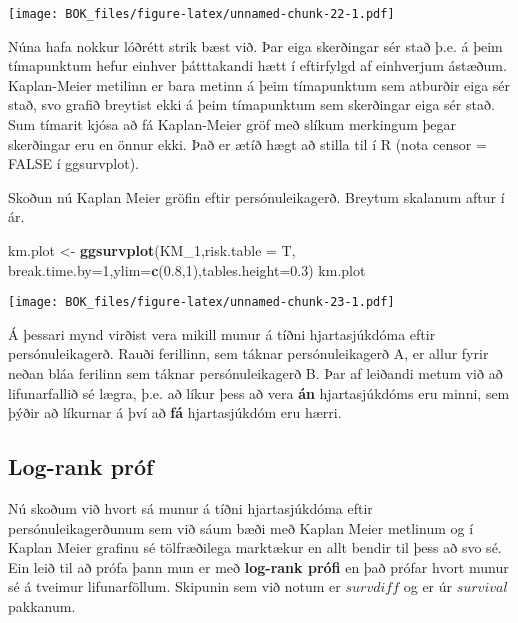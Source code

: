 \documentclass[
]{book}
\newenvironment{Shaded}{\begin{snugshade}}{\end{snugshade}}
\newcommand{\DataTypeTok}[1]{\textcolor[rgb]{0.13,0.29,0.53}{#1}}
\newcommand{\DecValTok}[1]{\textcolor[rgb]{0.00,0.00,0.81}{#1}}
\newcommand{\FloatTok}[1]{\textcolor[rgb]{0.00,0.00,0.81}{#1}}
\newcommand{\KeywordTok}[1]{\textcolor[rgb]{0.13,0.29,0.53}{\textbf{#1}}}
\newcommand{\NormalTok}[1]{#1}
\newcommand{\StringTok}[1]{\textcolor[rgb]{0.31,0.60,0.02}{#1}}
\begin{document}
\texttt{[image: BOK\_files/figure-latex/unnamed-chunk-22-1.pdf]}

Núna hafa nokkur lóðrétt strik bæst við. Þar eiga skerðingar sér stað þ.e. á þeim tímapunktum hefur einhver þátttakandi hætt í eftirfylgd af einhverjum ástæðum. Kaplan-Meier metilinn er bara metinn á þeim tímapunktum sem atburðir eiga sér stað, svo grafið breytist ekki á þeim tímapunktum sem skerðingar eiga sér stað. Sum tímarit kjósa að fá Kaplan-Meier gröf með slíkum merkingum þegar skerðingar eru en önnur ekki. Það er ætíð hægt að stilla til í R (nota censor = FALSE í ggsurvplot).

Skoðun nú Kaplan Meier gröfin eftir persónuleikagerð. Breytum skalanum aftur í ár.

\begin{Shaded}
\begin{Highlighting}[]
\NormalTok{km.plot <{-}}\StringTok{ }\KeywordTok{ggsurvplot}\NormalTok{(KM\_}\DecValTok{1}\NormalTok{,}\DataTypeTok{risk.table =}\NormalTok{ T,}
                        \DataTypeTok{break.time.by=}\DecValTok{1}\NormalTok{,}\DataTypeTok{ylim=}\KeywordTok{c}\NormalTok{(}\FloatTok{0.8}\NormalTok{,}\DecValTok{1}\NormalTok{),}\DataTypeTok{tables.height=}\FloatTok{0.3}\NormalTok{) }
\NormalTok{km.plot}
\end{Highlighting}
\end{Shaded}

\texttt{[image: BOK\_files/figure-latex/unnamed-chunk-23-1.pdf]}

Á þessari mynd virðist vera mikill munur á tíðni hjartasjúkdóma eftir persónuleikagerð. Rauði ferillinn, sem táknar persónuleikagerð A, er allur fyrir neðan bláa ferilinn sem táknar persónuleikagerð B. Þar af leiðandi metum við að lifunarfallið sé lægra, þ.e. að líkur þess að vera \textbf{án} hjartasjúkdóms eru minni, sem þýðir að líkurnar á því að \textbf{fá} hjartasjúkdóm eru hærri.

\hypertarget{log-rank-pruxf3f}{%
\subsection{Log-rank próf}\label{log-rank-pruxf3f}}

Nú skoðum við hvort sá munur á tíðni hjartasjúkdóma eftir persónuleikagerðunum sem við sáum bæði með Kaplan Meier metlinum og í Kaplan Meier grafinu sé tölfræðilega marktækur en allt bendir til þess að svo sé. Ein leið til að prófa þann mun er með \textbf{log-rank prófi} en það prófar hvort munur sé á tveimur lifunarföllum. Skipunin sem við notum er \(survdiff\) og er úr \(survival\) pakkanum.
\end{document}
